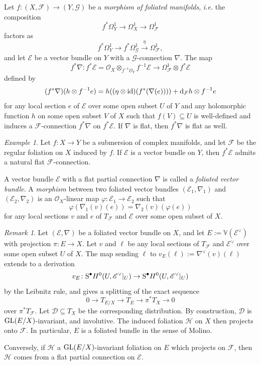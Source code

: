 \documentclass[english,10pt]{amsart}
\renewcommand{\phi}{\varphi}
\newcommand{\cF}{\mathcal{F}}
\newcommand{\cG}{\mathcal{G}}
\newcommand{\cH}{\mathcal{H}}
\newcommand{\sD}{\mathscr{D}}
\newcommand{\sE}{\mathscr{E}}
\newcommand{\sO}{\mathscr{O}}
\newcommand{\dd}{\textup{d}}
\theoremstyle{definition}
\theoremstyle{remark}
\newtheorem{rem}[thm]{Remark}
\newtheorem{exmp}[thm]{Example}
\numberwithin{equation}{section}
\begin{document}
Let $f \colon (X,\cF) \to (Y,\cG)$ be a \emph{morphism of foliated manifolds}, \textit{i.e.} the composition 
\[
f^*\Omega_Y^1 \longrightarrow \Omega_X^1 \longrightarrow \Omega_\cF^1
\] 
factors as 
\[
f^*\Omega_Y^1 \longrightarrow f^*\Omega_\cG^1 \overset{\eta}{\longrightarrow} \Omega_\cF^1,
\] 
and let $\sE$ be a vector bundle on $Y$ with a $\cG$-connection $\nabla$. The map 
\[
f^*\nabla \colon f^*\sE = \sO_X \otimes_{f^{-1}\sO_Y} f^{-1}\sE \to \Omega_\cF^1 \otimes f^*\sE 
\]
defined by 
\[
(f^*\nabla) (h \otimes f^{-1}e) = h ((\eta \otimes \textup{id})(f^*(\nabla (e)))) + \dd_\cF h \otimes f^{-1}e 
\]
for any local section $e$ of $\sE$ over some open subset $U$ of $Y$ and any holomorphic function $h$ on some open subset $V$ of $X$ such that $f(V) \subseteq U$ is well-defined and induces a $\cF$-connection $f^*\nabla$ on $f^*\sE$. If $\nabla$ is flat, then $f^*\nabla$ is flat as well. 

\begin{exmp}\label{exmp:canonical_connection_pull_back_foliation}
Let $f \colon X \to Y$ be a submersion of complex manifolds, and let $\cF$ be the regular foliation on $X$ induced by $f$. If $\sE$ is a vector bundle on $Y$, then $f^*\sE$ admits a natural flat $\cF$-connection. 
\end{exmp}

A vector bundle $\sE$ with a flat partial connection $\nabla$ is called a \emph{foliated vector bundle}. A \emph{morphism} between two foliated vector bundles $(\sE_1,\nabla_1)$ and $(\sE_2,\nabla_2)$ is an $\sO_X$-linear map $\phi \colon \sE_1 \to \sE_2$ such that
\[
\phi(\nabla_1(v)(e))=\nabla_2(v)(\phi(e))
\]
for any local sections $v$ and $e$ of $T_\cF$ and $\sE$ over some open subset of $X$.

\begin{rem}\label{remark:Ehresmann_versus_Koszul}
Let $(\sE,\nabla)$ be a foliated vector bundle on $X$, and let $E:=\mathbb{V}(\sE^\vee)$ with projection $\pi\colon E \to X$. Let $v$ and $\ell$ be any local sections of $T_\cF$ and $\sE^\vee$ over some open subset $U$ of $X$. The map sending $\ell$ to $v_E(\ell):=\nabla^\vee(v)(\ell)$ extends to a derivation
\[
v_E \colon \textup{S}^\bullet H^0(U,\sE^\vee|_U) \to \textup{S}^\bullet H^0(U,\sE^\vee|_U)
\]
by the Leibnitz rule, and gives a splitting of the exact sequence
\[
0 \to T_{E/X} \to T_E \to \pi^*T_X \to 0
\]
over $\pi^*T_\cF$. Let $\sD \subseteq T_X$ be the corresponding distribution. By construction, $\sD$ is $\textup{GL}(E/X)$-invariant, and involutive. The induced foliation $\cH$ on $X$ then projects onto $\cF$. In particular, $E$ is a foliated bundle in the sense of Molino.

Conversely, if $\cH$ a $\textup{GL}(E/X)$-invariant foliation on $E$ which projects on $\cF$, then 
$\cH$ comes from a flat partial connection on $\sE$.
\end{rem}
\end{document}
